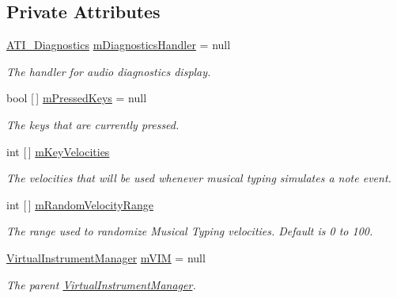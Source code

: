 \subsection*{Private Attributes}
\begin{DoxyCompactItemize}
\item 
\hyperlink{group___audio_testing_class_a_t_i___diagnostics}{A\+T\+I\+\_\+\+Diagnostics} \hyperlink{group___mus_typ_priv_var_gaaeabcb1c6445b0ff93059036cc4ec1f4}{m\+Diagnostics\+Handler} = null
\begin{DoxyCompactList}\small\item\em The handler for audio diagnostics display. \end{DoxyCompactList}\item 
bool \mbox{[}$\,$\mbox{]} \hyperlink{group___mus_typ_priv_var_gaede8bc4123f7bfe514816593fdfbec67}{m\+Pressed\+Keys} = null
\begin{DoxyCompactList}\small\item\em The keys that are currently pressed. \end{DoxyCompactList}\item 
int \mbox{[}$\,$\mbox{]} \hyperlink{group___mus_typ_priv_var_ga4836c9fe1805279497f421a29879bf5a}{m\+Key\+Velocities}
\begin{DoxyCompactList}\small\item\em The velocities that will be used whenever musical typing simulates a note event. \end{DoxyCompactList}\item 
int \mbox{[}$\,$\mbox{]} \hyperlink{group___mus_typ_priv_var_ga15df83911d88e77e46726ff5642d04e6}{m\+Random\+Velocity\+Range}
\begin{DoxyCompactList}\small\item\em The range used to randomize Musical Typing velocities. Default is 0 to 100. \end{DoxyCompactList}\item 
\hyperlink{class_virtual_instrument_manager}{Virtual\+Instrument\+Manager} \hyperlink{group___mus_typ_priv_var_ga63b2c5e1f9b1320a6b435a9018759444}{m\+V\+IM} = null
\begin{DoxyCompactList}\small\item\em The parent \hyperlink{class_virtual_instrument_manager}{Virtual\+Instrument\+Manager}. \end{DoxyCompactList}\end{DoxyCompactItemize}
